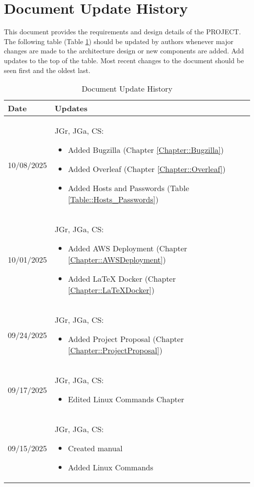 \section{Document Update History}

This document provides the requirements and design details of the
PROJECT.  The following table (Table \ref{Table::UpdateHistory}) should be
updated by authors whenever major changes are made to the architecture
design or new components are added. Add updates to the top of the table.  
Most recent changes to the document should be seen first and the oldest 
last.

\begin{longtable}{|l||p{12.5cm}|}
\caption{Document Update History \label{Table::UpdateHistory}}\\
\hline
\textbf{Date} & \textbf{Updates} \\
\hline 
\endhead

10/08/2025 & JGr, JGa, CS:
\begin{itemize}[topsep=0pt,itemsep=0pt,parsep=0pt,partopsep=0pt,leftmargin=12pt]
\item Added Bugzilla (Chapter \ref{Chapter::Bugzilla})
\item Added Overleaf (Chapter \ref{Chapter::Overleaf})
\item Added Hosts and Passwords (Table \ref{Table::Hosts_Passwords})
\end{itemize} 
\\ \hline

10/01/2025 & JGr, JGa, CS:
\begin{itemize}[topsep=0pt,itemsep=0pt,parsep=0pt,partopsep=0pt,leftmargin=12pt]
\item Added AWS Deployment (Chapter \ref{Chapter::AWSDeployment})
\item Added LaTeX Docker (Chapter \ref{Chapter::LaTeXDocker})
\end{itemize} 
\\ \hline

09/24/2025 & JGr, JGa, CS:
\begin{itemize}[topsep=0pt,itemsep=0pt,parsep=0pt,partopsep=0pt,leftmargin=12pt]
\item Added Project Proposal (Chapter \ref{Chapter::ProjectProposal})
\end{itemize} 
\\ \hline

09/17/2025 & JGr, JGa, CS:
\begin{itemize}[topsep=0pt,itemsep=0pt,parsep=0pt,partopsep=0pt,leftmargin=12pt]
\item Edited Linux Commands Chapter
\end{itemize} 
\\ \hline

09/15/2025 & JGr, JGa, CS:
\begin{itemize}[topsep=0pt,itemsep=0pt,parsep=0pt,partopsep=0pt,leftmargin=12pt]
\item Created manual
\item Added Linux Commands
\end{itemize} 
\\ \hline

\end{longtable}

